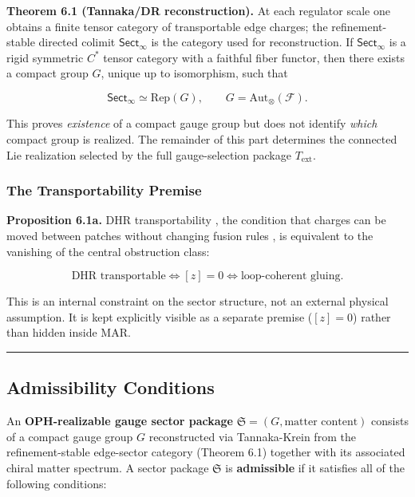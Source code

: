 \textbf{Theorem 6.1 (Tannaka/DR reconstruction).} At each regulator scale one obtains a finite tensor category of transportable edge charges; the refinement-stable directed colimit \(\mathsf{Sect}_\infty\) is the category used for reconstruction. If \(\mathsf{Sect}_\infty\) is a rigid symmetric \(C^*\) tensor category with a faithful fiber functor, then there exists a compact group \(G\), unique up to isomorphism, such that

\[\mathsf{Sect}_\infty \simeq \mathrm{Rep}(G), \qquad G = \mathrm{Aut}_\otimes(\mathcal{F}).\]

This proves \emph{existence} of a compact gauge group but does not identify \emph{which} compact group is realized. The remainder of this part determines the connected Lie realization selected by the full gauge-selection package \(T_{\mathrm{ext}}\).

\subsubsection{The Transportability Premise}\label{13-the-transportability-premise}

\textbf{Proposition 6.1a.} DHR transportability , the condition that charges can be moved between patches without changing fusion rules , is equivalent to the vanishing of the central obstruction class:

\[\text{DHR transportable} \iff [z] = 0 \iff \text{loop-coherent gluing}.\]

This is an internal constraint on the sector structure, not an external physical assumption. It is kept explicitly visible as a separate premise (\([z]=0\)) rather than hidden inside MAR.

\begin{center}\rule{0.5\linewidth}{0.5pt}\end{center}

\subsection{Admissibility Conditions}\label{2-admissibility-conditions}

An \textbf{OPH-realizable gauge sector package} \(\mathfrak S = (G, \text{matter content})\) consists of a compact gauge group \(G\) reconstructed via Tannaka-Krein from the refinement-stable edge-sector category (Theorem 6.1) together with its associated chiral matter spectrum. A sector package \(\mathfrak S\) is \textbf{admissible} if it satisfies all of the following conditions:

